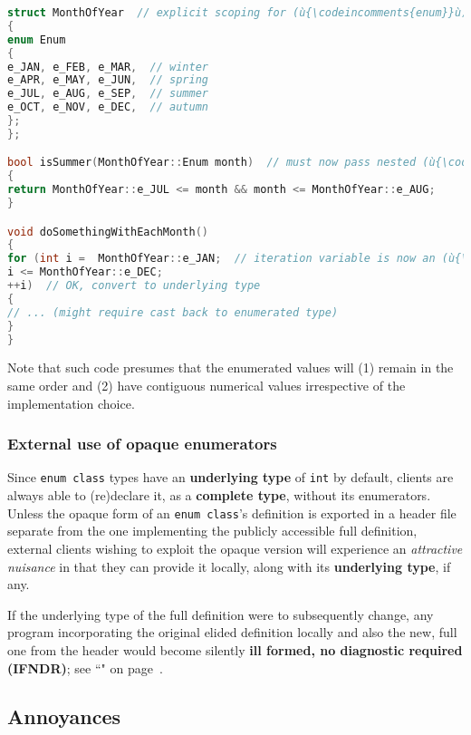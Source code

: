 \begin{lstlisting}[language=C++]
struct MonthOfYear  // explicit scoping for (ù{\codeincomments{enum}}ù)
{
enum Enum
{
e_JAN, e_FEB, e_MAR,  // winter
e_APR, e_MAY, e_JUN,  // spring
e_JUL, e_AUG, e_SEP,  // summer
e_OCT, e_NOV, e_DEC,  // autumn
};
};

bool isSummer(MonthOfYear::Enum month)  // must now pass nested (ù{\codeincomments{Enum}}ù) type
{
return MonthOfYear::e_JUL <= month && month <= MonthOfYear::e_AUG;
}

void doSomethingWithEachMonth()
{
for (int i =  MonthOfYear::e_JAN;  // iteration variable is now an (ù{\codeincomments{int}}ù)
i <= MonthOfYear::e_DEC;
++i)  // OK, convert to underlying type
{
// ... (might require cast back to enumerated type)
}
}
\end{lstlisting}

\noindent Note that such code presumes that the enumerated values will (1) remain
in the same order and (2) have contiguous numerical values irrespective
of the implementation choice.

\subsubsection[External use of opaque enumerators]{External use of opaque enumerators}\label{external-use-of-opaque-enumerators}

Since \texttt{enum}~\texttt{class} types have an \textbf{underlying
type} of \texttt{int} by default, clients are always able to (re)declare
it, as a \textbf{complete type}, without its enumerators. Unless the
opaque form of an \texttt{enum}~\texttt{class}'s definition is exported
in a header file separate from the one implementing the publicly
accessible full definition, external clients wishing to exploit the
opaque version will experience an \emph{attractive nuisance} in that
they can provide it locally, along with its \textbf{underlying type}, if
any.

If the underlying type of the full definition were to subsequently
change, any program incorporating the original elided definition locally
and also the new, full one from the header would become silently \textbf{ill formed, no diagnostic required (IFNDR)}; see ``" on page~\pageref{enumopaque}.

\subsection[Annoyances]{Annoyances}\label{annoyances-enumclass}

